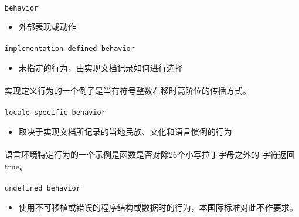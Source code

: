 \paragraph{}
\texttt{behavior}
\begin{itemize}
  \item[]{外部表现或动作}
\end{itemize}

\paragraph{}
\texttt{implementation-defined behavior}
\begin{itemize}
  \item[]{未指定的行为，由实现文档记录如何进行选择}
\end{itemize}

\paragraph{}
\ex* 实现定义行为的一个例子是当有符号整数右移时高阶位的传播方式。

\paragraph{}
\texttt{locale-specific behavior}
\begin{itemize}
  \item[]{取决于实现文档所记录的当地民族、文化和语言惯例的行为}
\end{itemize}

\paragraph{}
\ex* 语言环境特定行为的一个示例是函数是否对除26个小写拉丁字母之外的
字符返回true。

\paragraph{}
\texttt{undefined behavior}
\begin{itemize}
  \item[]{使用不可移植或错误的程序结构或数据时的行为，本国际标准对此不作要求。}
\end{itemize}


